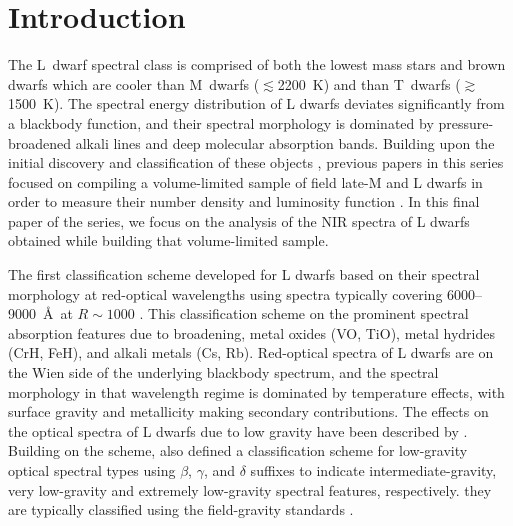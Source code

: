 \documentclass[modern]{aastex61}
\begin{document}
\section{Introduction}
The L~dwarf spectral class is comprised of both the lowest mass stars and brown dwarfs which are cooler than M~dwarfs ($\lesssim$2200~K) and  than T~dwarfs ($\gtrsim$1500~K).
The spectral energy distribution of L dwarfs deviates significantly from a blackbody function, and their spectral morphology is dominated by pressure-broadened alkali lines and deep molecular absorption bands.
Building upon the initial discovery and classification of these objects \citep{Becklin88_GD165B,K99,Martin99,Kirkpatrick05}, previous papers in this series focused on compiling a volume-limited sample of field late-M and L dwarfs in order to measure their number density and luminosity function \citep[Papers V, IX, and X]{Cruz03,Cruz07,Reid08}.
In this final paper of the series, we focus on the analysis of the NIR spectra of L dwarfs obtained while building that volume-limited sample.

The first classification scheme developed for L dwarfs  based on their spectral morphology at red-optical wavelengths using spectra typically covering 6000--9000~\AA~at $R\sim1000$ \citep{Martin99,K99,Kirkpatrick05}.
This classification scheme  on the prominent spectral absorption features due to  broadening, metal oxides (VO, TiO), metal hydrides (CrH, FeH), and alkali metals (Cs, Rb).
Red-optical spectra of L dwarfs are on the Wien side of the underlying blackbody spectrum, and the spectral morphology in that wavelength regime is dominated by temperature effects, with surface gravity and metallicity making secondary contributions.
The effects on the optical spectra of L dwarfs due to low gravity have been described by \citet{Martin99,Kirkpatrick06,Kirkpatrick08, Cruz09_lowg,Luhman09_taurus}.
Building on the \citet{K99} scheme, \citet{Cruz09_lowg} also defined a classification scheme for low-gravity optical spectral types using $\beta$, $\gamma$, and $\delta$ suffixes to indicate intermediate-gravity, very low-gravity and extremely low-gravity spectral features, respectively.
 they are typically classified using the field-gravity standards \citep{Gizis:2006jl,Burgasser07_subdwarfs, Burgasser08_blue, Kirkpatrick10, Kirkpatrick:2014kv}.
\end{document}
